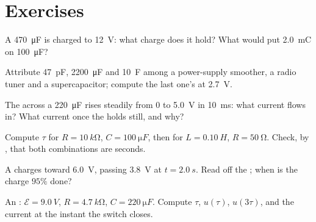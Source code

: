 \section{Exercises}

\begin{exercise}[$\star$]\label{exo:g12:rc-rl-circuits:1}
A \qty{470}{\micro F}  is charged to \qty{12}{V}: what charge does
it hold? What  would put \qty{2.0}{mC} on \qty{100}{\micro F}?
\end{exercise}

\begin{exercise}[$\star$]\label{exo:g12:rc-rl-circuits:2}
Attribute \qty{47}{pF}, \qty{2200}{\micro F} and \qty{10}{F} among a
power-supply smoother, a radio tuner and a supercapacitor; compute the last
one's  at \qty{2.7}{V}.
\end{exercise}

\begin{exercise}[$\star$]\label{exo:g12:rc-rl-circuits:3}
The  across a \qty{220}{\micro F}  rises steadily from $0$
to \qty{5.0}{V} in \qty{10}{ms}: what current flows in? What current once
the  holds still, and why?
\end{exercise}

\begin{exercise}[$\star$]\label{exo:g12:rc-rl-circuits:4}
Compute $\tau$ for $R = \qty{10}{k\ohm}$, $C = \qty{100}{\micro F}$, then
for $L = \qty{0.10}{H}$, $R = \qty{50}{\ohm}$. Check,  by , that
both combinations are seconds.
\end{exercise}

\begin{exercise}[$\star$]\label{exo:g12:rc-rl-circuits:5}
A  charges toward \qty{6.0}{V}, passing \qty{3.8}{V} at
$t = \qty{2.0}{s}$. Read off the ; when is the charge $95\%$ done?
\end{exercise}

\begin{exercise}[$\star\star$]\label{exo:g12:rc-rl-circuits:6}
An : $\mathcal{E} = \qty{9.0}{V}$, $R = \qty{4.7}{k\ohm}$,
$C = \qty{220}{\micro F}$. Compute $\tau$, $u(\tau)$, $u(3\tau)$, and the
current at the instant the switch closes.
\end{exercise}

